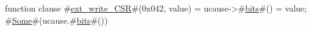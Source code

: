 function clause #\hyperref[sailRISCVzextzywritezyCSR]{ext\_write\_CSR}#(0x042, value) = { ucause->#\hyperref[sailRISCVzbits]{bits}#() = value; #\hyperref[sailRISCVzSome]{Some}#(ucause.#\hyperref[sailRISCVzbits]{bits}#()) }

